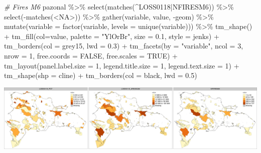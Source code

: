 \documentclass[10pt,landscape,a3paper]{article}
\newenvironment{Shaded}{\begin{snugshade}}{\end{snugshade}}
\newcommand{\AttributeTok}[1]{\textcolor[rgb]{0.77,0.63,0.00}{#1}}
\newcommand{\CommentTok}[1]{\textcolor[rgb]{0.56,0.35,0.01}{\textit{#1}}}
\newcommand{\ConstantTok}[1]{\textcolor[rgb]{0.00,0.00,0.00}{#1}}
\newcommand{\DecValTok}[1]{\textcolor[rgb]{0.00,0.00,0.81}{#1}}
\newcommand{\FloatTok}[1]{\textcolor[rgb]{0.00,0.00,0.81}{#1}}
\newcommand{\FunctionTok}[1]{\textcolor[rgb]{0.00,0.00,0.00}{#1}}
\newcommand{\NormalTok}[1]{#1}
\newcommand{\SpecialCharTok}[1]{\textcolor[rgb]{0.00,0.00,0.00}{#1}}
\newcommand{\StringTok}[1]{\textcolor[rgb]{0.31,0.60,0.02}{#1}}
\begin{document}
\begin{Shaded}
\begin{Highlighting}[]

\CommentTok{\# Fires M6}
\NormalTok{pazonal }\SpecialCharTok{\%\textgreater{}\%} \FunctionTok{select}\NormalTok{(}\FunctionTok{matches}\NormalTok{(}\StringTok{\textquotesingle{}\^{}LOSS0118|NFIRESM6\textquotesingle{}}\NormalTok{)) }\SpecialCharTok{\%\textgreater{}\%} \FunctionTok{select}\NormalTok{(}\SpecialCharTok{{-}}\FunctionTok{matches}\NormalTok{(}\StringTok{\textquotesingle{}\textless{}NA\textgreater{}\textquotesingle{}}\NormalTok{)) }\SpecialCharTok{\%\textgreater{}\%} 
  \FunctionTok{gather}\NormalTok{(variable, value, }\SpecialCharTok{{-}}\NormalTok{geom) }\SpecialCharTok{\%\textgreater{}\%}
  \FunctionTok{mutate}\NormalTok{(}\AttributeTok{variable =} \FunctionTok{factor}\NormalTok{(variable, }\AttributeTok{levels =} \FunctionTok{unique}\NormalTok{(variable))) }\SpecialCharTok{\%\textgreater{}\%} 
  \FunctionTok{tm\_shape}\NormalTok{() }\SpecialCharTok{+}
  \FunctionTok{tm\_fill}\NormalTok{(}\AttributeTok{col=}\StringTok{\textquotesingle{}value\textquotesingle{}}\NormalTok{, }\AttributeTok{palette =} \StringTok{"YlOrBr"}\NormalTok{, }\AttributeTok{size =} \FloatTok{0.1}\NormalTok{, }\AttributeTok{style =} \StringTok{\textquotesingle{}jenks\textquotesingle{}}\NormalTok{) }\SpecialCharTok{+}
  \FunctionTok{tm\_borders}\NormalTok{(}\AttributeTok{col =} \StringTok{\textquotesingle{}grey15\textquotesingle{}}\NormalTok{, }\AttributeTok{lwd =} \FloatTok{0.3}\NormalTok{) }\SpecialCharTok{+}
  \FunctionTok{tm\_facets}\NormalTok{(}\AttributeTok{by =} \StringTok{"variable"}\NormalTok{, }\AttributeTok{ncol =} \DecValTok{3}\NormalTok{, }\AttributeTok{nrow =} \DecValTok{1}\NormalTok{, }\AttributeTok{free.coords =} \ConstantTok{FALSE}\NormalTok{, }\AttributeTok{free.scales =} \ConstantTok{TRUE}\NormalTok{) }\SpecialCharTok{+}
  \FunctionTok{tm\_layout}\NormalTok{(}\AttributeTok{panel.label.size =} \DecValTok{1}\NormalTok{, }\AttributeTok{legend.title.size =} \DecValTok{1}\NormalTok{, }\AttributeTok{legend.text.size =} \DecValTok{1}\NormalTok{) }\SpecialCharTok{+} 
  \FunctionTok{tm\_shape}\NormalTok{(}\AttributeTok{shp =}\NormalTok{ cline) }\SpecialCharTok{+} \FunctionTok{tm\_borders}\NormalTok{(}\AttributeTok{col =} \StringTok{\textquotesingle{}black\textquotesingle{}}\NormalTok{, }\AttributeTok{lwd =} \FloatTok{0.5}\NormalTok{)}
\end{Highlighting}
\end{Shaded}

\begin{center}\includegraphics{img/data-download-preparation-eda/zonal-pa-8} \end{center}
\end{document}
